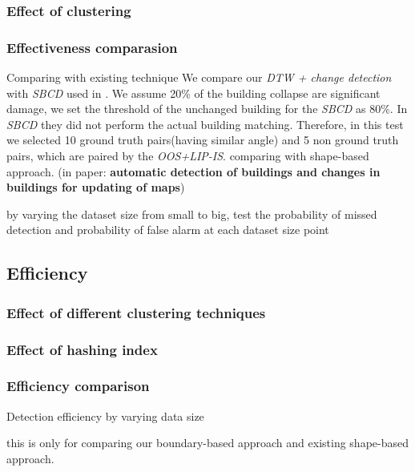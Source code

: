 \documentclass[runningheads,a4paper]{llncs}
\begin{document}
\subsubsection{Effect of clustering}

\subsubsection{Effectiveness comparasion}
Comparing with existing technique
We compare our \textit{DTW + change detection} with \textit{SBCD} used in \cite{rs2051217}. We assume 20\% of the building collapse are significant damage, we set the threshold of the unchanged building for the \textit{SBCD} as 80\%.
In \textit{SBCD} they did not perform the actual building matching. Therefore, in this test we selected 10 ground truth pairs(having similar angle) and 5 non ground truth pairs, which are paired by the \textit{OOS+LIP-IS}. 
comparing with shape-based approach. (in paper: \textbf{automatic detection of buildings and changes in buildings for updating of maps})

by varying the dataset size from small to big, test the probability of missed detection and probability of false alarm at each dataset size point


\subsection{Efficiency}

\subsubsection{Effect of different clustering techniques}
\subsubsection{Effect of hashing index}

\subsubsection{Efficiency comparison}

Detection efficiency by varying data size

this is only for comparing our boundary-based approach and existing shape-based approach.
\end{document}
